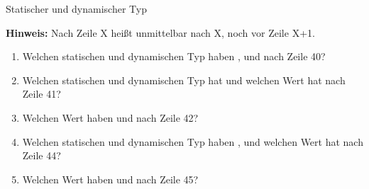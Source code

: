 \documentclass{../preamble}
\begin{document}
\begin{task}[credit = \stars{2}{3}]{Statischer und dynamischer Typ}
    
    \textbf{Hinweis:} Nach Zeile X heißt unmittelbar nach X, noch vor Zeile X+1.
    \begin{enumerate}[label = (\arabic*)]
        \item Welchen statischen und dynamischen Typ haben ,  und  nach Zeile 40?
        \item Welchen statischen und dynamischen Typ hat  und welchen Wert hat  nach Zeile 41?
        \item Welchen Wert haben  und  nach Zeile 42?
        \item Welchen statischen und dynamischen Typ haben ,  und welchen Wert hat  nach Zeile 44?
        \item Welchen Wert haben  und  nach Zeile 45?
    \end{enumerate}

    \clearpage


\end{task}
\end{document}
